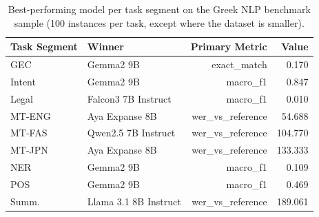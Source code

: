 \begin{table}[t]
\centering
\caption{Best-performing model per task segment on the Greek NLP benchmark sample (100 instances per task, except where the dataset is smaller).}
\label{tab:task-winners}
\begin{tabular}{llrr}
\toprule
Task Segment & Winner & Primary Metric & Value \\
\midrule
GEC & Gemma2 9B & exact\_match & 0.170 \\
Intent & Gemma2 9B & macro\_f1 & 0.847 \\
Legal & Falcon3 7B Instruct & macro\_f1 & 0.010 \\
MT-ENG & Aya Expanse 8B & wer\_vs\_reference & 54.688 \\
MT-FAS & Qwen2.5 7B Instruct & wer\_vs\_reference & 104.770 \\
MT-JPN & Aya Expanse 8B & wer\_vs\_reference & 133.333 \\
NER & Gemma2 9B & macro\_f1 & 0.109 \\
POS & Gemma2 9B & macro\_f1 & 0.469 \\
Summ. & Llama 3.1 8B Instruct & wer\_vs\_reference & 189.061 \\
\bottomrule
\end{tabular}
\end{table}